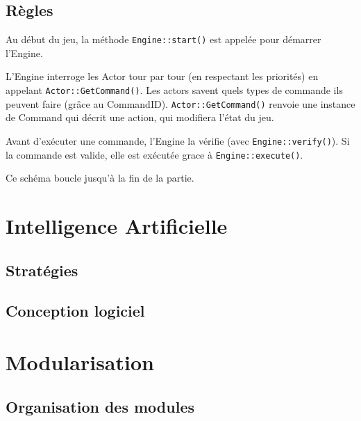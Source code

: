 \documentclass[a4paper,12pt]{article}
\begin{document}
\subsection{Règles}

Au début du jeu, la méthode \texttt{Engine::start()} est appelée pour démarrer l'Engine.

L'Engine interroge les Actor tour par tour (en respectant les priorités) en appelant \texttt{Actor::GetCommand()}.
Les actors savent quels types de commande ils peuvent faire (grâce au CommandID).
\texttt{Actor::GetCommand()} renvoie une instance de Command qui décrit une action, qui modifiera l'état du jeu.

Avant d'exécuter une commande, l'Engine la vérifie (avec \texttt{Engine::verify()}).
Si la commande est valide, elle est exécutée grace à \texttt{Engine::execute()}.

Ce schéma boucle jusqu'à la fin de la partie.

\clearpage

\section{Intelligence Artificielle}

\subsection{Stratégies}

\clearpage
\subsection{Conception logiciel}




\section{Modularisation}
\label{sec:module}

\subsection{Organisation des modules}
\end{document}
